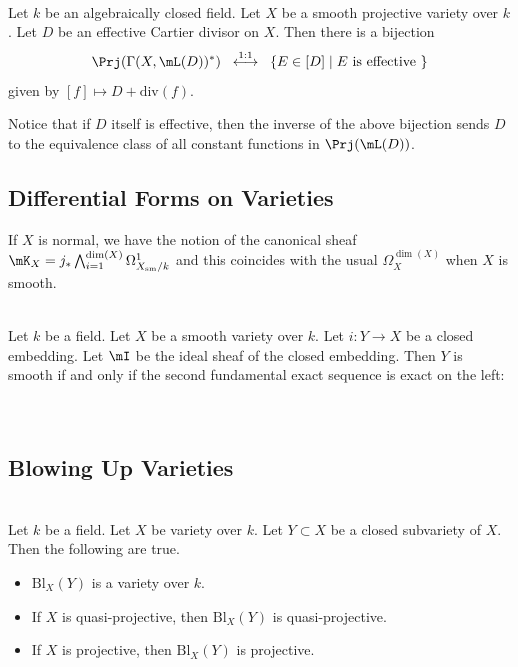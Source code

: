 \documentclass[a4paper]{article}
\begin{document}
\begin{prp}{}{}\\
Let $k$ be an algebraically closed field. Let $X$ be a smooth projective variety over $k$. Let $D$ be an effective Cartier divisor on $X$. Then there is a bijection $$\Prj(\Gamma(X,\mL(D))^\ast)\;\;\overset{1:1}{\longleftrightarrow}\;\;\{E\in[D]\;|\;E\text{ is effective }\}$$ given by $[f]\mapsto D+\text{div}(f)$. 
\end{prp}

Notice that if $D$ itself is effective, then the inverse of the above bijection sends $D$ to the equivalence class of all constant functions in $\Prj(\mL(D))$. 

\subsection{Differential Forms on Varieties}
If $X$ is normal, we have the notion of the canonical sheaf $\mK_X=j_\ast\bigwedge_{i=1}^{\dim(X)}\Omega_{X_\text{sm}/k}^1$ and this coincides with the usual $\Omega_X^{\dim(X)}$ when $X$ is smooth. 

\begin{prp}{}{}\\
Let $k$ be a field. Let $X$ be a smooth variety over $k$. Let $i:Y\to X$ be a closed embedding. Let $\mI$ be the ideal sheaf of the closed embedding. Then $Y$ is smooth if and only if the second fundamental exact sequence is exact on the left: \\
\\~\\
\end{prp}

\subsection{Blowing Up Varieties}
\begin{prp}{}{}\\
Let $k$ be a field. Let $X$ be variety over $k$. Let $Y\subset X$ be a closed subvariety of $X$. Then the following are true. 
\begin{itemize}
\item $\text{Bl}_X(Y)$ is a variety over $k$. 
\item If $X$ is quasi-projective, then $\text{Bl}_X(Y)$ is quasi-projective. 
\item If $X$ is projective, then $\text{Bl}_X(Y)$ is projective. 
\end{itemize}
\end{prp}
\end{document}
